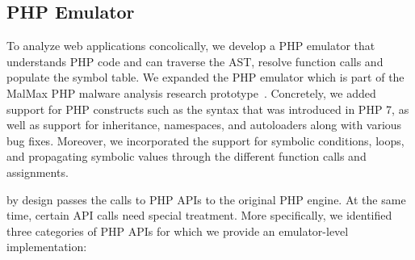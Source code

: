 \subsection{PHP Emulator}
\label{sec:emulator}

To analyze web applications concolically, we develop a PHP emulator that understands PHP code and can traverse the AST, resolve function calls and populate the symbol table. 
We expanded the PHP emulator which is part of the MalMax PHP malware analysis research prototype~\cite{naderi2019malmax}. 
Concretely, we added support for PHP constructs such as the syntax that was introduced in PHP 7, as well as support for inheritance, namespaces, and autoloaders along with various bug fixes. 
Moreover, we incorporated the support for symbolic conditions, loops, and propagating symbolic values through the different function calls and assignments. 

\animatedead{} by design passes the calls to PHP APIs to the original PHP engine. 
At the same time, certain API calls need special treatment. 
More specifically, we identified three categories of PHP APIs for which we provide an emulator-level implementation:


